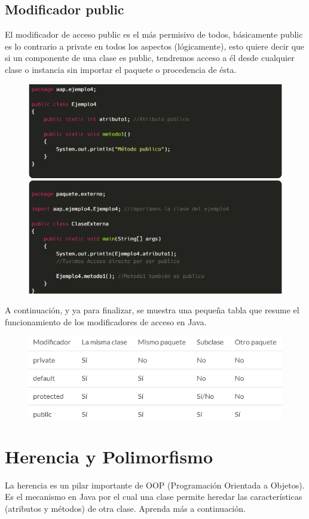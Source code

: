 \documentclass[12pt,a4paper]{report}
\begin{document}
{\subsection*{Modificador public}
El modificador de acceso public es el más permisivo de todos, básicamente public es lo contrario a private en todos los aspectos (lógicamente), esto quiere decir que si un componente de una clase es public, tendremos acceso a él desde cualquier clase o instancia sin importar el paquete o procedencia de ésta.
\begin{figure}[hbtp]
\centering
\includegraphics[scale=0.5]{5.PNG}
\end{figure}


A continuación, y ya para finalizar, se muestra una pequeña tabla que resume el funcionamiento de los modificadores de acceso en Java.
\begin{figure}[hbtp]
\centering
\includegraphics[scale=0.4]{6.PNG}
\end{figure}
\section*{Herencia y Polimorfismo}
La herencia es un pilar importante de OOP (Programación Orientada a Objetos). Es el mecanismo en Java por el cual una clase permite heredar las características (atributos y métodos) de otra clase. Aprenda más a continuación.

}
\end{document}
